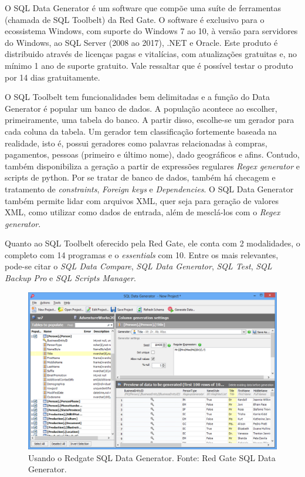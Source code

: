 \documentclass[
	12pt,				%
	openright,			%
	twoside,			%
	a4paper,			%
	english,			%
	brazil				%
	]{abntex2}
\begin{document}
			O SQL Data Generator \cite{RedgateSQLDataGenerator} é um software que compõe uma suíte de ferramentas (chamada de SQL Toolbelt) da Red Gate.
			O software é exclusivo para o ecossistema Windows, com suporte do Windows 7 ao 10, à versão para servidores do Windows, ao SQL Server (2008 ao 2017), .NET e Oracle.
			Este produto é distribuido através de licenças pagas e vitalícias, com atualizações gratuitas e, no mínimo 1 ano de suporte gratuito.
			Vale ressaltar que é possível testar o produto por 14 dias gratuitamente.
			\par
			O SQL Toolbelt tem funcionalidades bem delimitadas e a função do Data Generator é popular um banco de dados. 
			A população acontece ao escolher, primeiramente, uma tabela do banco.
			A partir disso, escolhe-se um gerador para cada coluna da tabela.
			Um gerador tem classificação fortemente baseada na realidade, isto é, possui geradores como palavras relacionadas à compras, pagamentos, pessoas (primeiro e último nome), dado geográficos e afins.
			Contudo, também disponibiliza a geração a partir de expressões regulares \emph{Regex generator} e scripts de python.
			Por se tratar de banco de dados, também há checagem e tratamento de \emph{constraints}, \emph{Foreign keys} e \emph{Dependencies}.
			O SQL Data Generator também permite lidar com arquivos XML, quer seja para geração de valores XML, como utilizar como dados de entrada, além de mesclá-los com o \emph{Regex generator}.
			\par
			Quanto ao SQL Toolbelt oferecido pela Red Gate, ele conta com 2 modalidades, o completo com 14 programas e o \emph{essentials} com 10.
			Entre os mais relevantes, pode-se citar o \emph{SQL Data Compare}, \emph{SQL Data Generator}, \emph{SQL Test}, \emph{SQL Backup Pro} e \emph{SQL Scripts Manager}.
			\begin{figure}[h]
				\centering
				\includegraphics[width=\linewidth]{./figures/TrabalhosRelacionados/sql-data-generator.png}
				\caption{Usando o Redgate SQL Data Generator. Fonte: Red Gate SQL Data Generator.}
				\label{fig:RedgateSQLDG}
			\end{figure}
\end{document}
